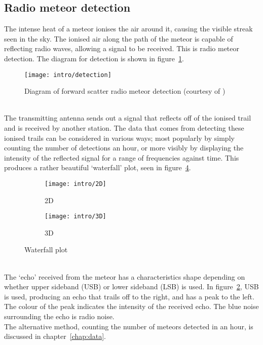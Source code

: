 \subsection{Radio meteor detection}
The intense heat of a meteor ionises the air around it, causing the visible streak seen in the sky. The ionised air along the path of the meteor is capable of reflecting radio waves, allowing a signal to be received. This is radio meteor detection. The diagram for detection is shown in figure~\ref{fig:detection}. 
\begin{figure}
	\centering
	\texttt{[image: intro/detection]}
	\caption{Diagram of forward scatter radio meteor detection (courtesy of \cite{forwardscatter})
		\label{fig:detection}}
\end{figure}\\
The transmitting antenna sends out a signal that reflects off of the ionised trail and is received by another station. The data that comes from detecting these ionised trails can be considered in various ways; most popularly by simply counting the number of detections an hour, or more visibly by displaying the intensity of the reflected signal for a range of frequencies against time. This produces a rather beautiful `waterfall' plot, seen in figure~\ref{fig:waterfall}. 
\begin{figure}[h!]
	\centering
	\begin{subfigure}{.24\textwidth}
		\texttt{[image: intro/2D]}
		\caption{2D\label{fig:waterfall:a}}
	\end{subfigure}
	\begin{subfigure}{.24\textwidth}
		\texttt{[image: intro/3D]}
		\caption{3D \label{fig:waterfall:b}}
	\end{subfigure}
	\caption{Waterfall plot 
	\label{fig:waterfall}}
\end{figure}\\
The `echo' received from the meteor has a characteristics shape depending on whether upper sideband (USB) or lower sideband (LSB) is used. In figure~\ref{fig:waterfall:a}, USB is used, producing an echo that trails off to the right, and has a peak to the left. The colour of the peak indicates the intensity of the received echo. The blue noise surrounding the echo is radio noise.\\
The alternative method, counting the number of meteors detected in an hour, is discussed in chapter~\ref{chap:data}.

